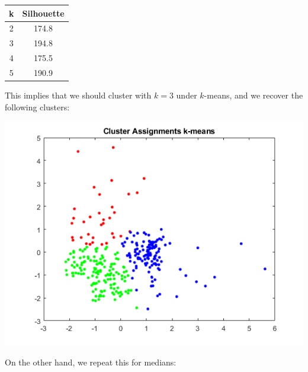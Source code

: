 \documentclass[sn-mathphys,Numbered]{sn-jnl}
\begin{document}
\begin{center}
\begin{tabular}{|| c| c||}
\hline
k & Silhouette \\

\hline \hline
2 & 174.8 \\ \hline
3 & 194.8 \\ \hline
4 & 175.5 \\ \hline
5 & 190.9 \\ \hline
\end{tabular}
\end{center}

This implies that we should cluster with $k  = 3$ under $k$-means, and we recover the following clusters:

\begin{center}
\includegraphics[width=\linewidth]{k_means_clusters}
\end{center}

On the other hand, we repeat this for medians:
\end{document}
